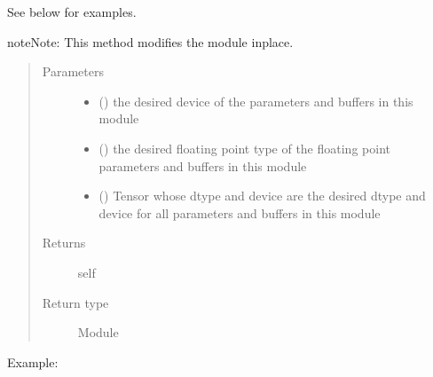 \documentclass[letterpaper,10pt,english]{sphinxmanual}
\begin{document}
\begin{fulllineitems}
\begin{fulllineitems}
See below for examples.

\begin{sphinxadmonition}{note}{Note:}
This method modifies the module in\sphinxhyphen{}place.
\end{sphinxadmonition}
\begin{quote}\begin{description}
\item[{Parameters}] \leavevmode\begin{itemize}
\item {} 
 () \textendash{} the desired device of the parameters
and buffers in this module

\item {} 
 () \textendash{} the desired floating point type of
the floating point parameters and buffers in this module

\item {} 
 () \textendash{} Tensor whose dtype and device are the desired
dtype and device for all parameters and buffers in this module

\end{itemize}

\item[{Returns}] \leavevmode
self

\item[{Return type}] \leavevmode
Module

\end{description}\end{quote}

Example:


\end{fulllineitems}
\end{fulllineitems}
\end{document}
